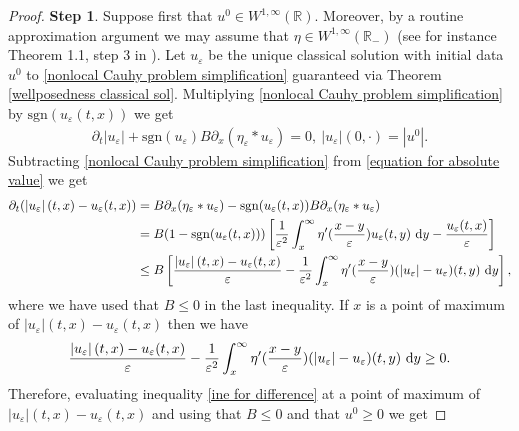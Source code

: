 \documentclass[11pt,reqno]{amsart}
\numberwithin{equation}{section}
\def\dd{{\rm d}}
\begin{document}
\begin{proof} \textbf{Step 1}. Suppose first that $u^{0}\in W^{1,\infty}(\mathbb{R})$. Moreover, by a routine approximation argument we may assume that $\eta\in W^{1,\infty}(\mathbb{R}_{-})$ (see for instance Theorem 1.1, step 3 in \cite{colombo2023nonlocal}). Let $u_{\varepsilon}$ be the unique classical solution with initial data $u^{0}$ to \eqref{nonlocal Cauhy problem simplification} guaranteed via Theorem \ref{wellposedness classical sol}. Multiplying \eqref{nonlocal Cauhy problem simplification} by $\mathrm{sgn}(u_{\varepsilon}(t,x))$ we get 
\begin{align}
\partial_{t}\left\vert u_{\varepsilon}\right\vert+\mathrm{sgn}(u_{\varepsilon})B\partial_{x}(\eta_{\varepsilon}\ast u_{\varepsilon})=0, \ \left\vert u_{\varepsilon}\right\vert (0,\cdot)=\left\vert u^{0}\right\vert. \label{equation for absolute value}  \end{align}
Subtracting \eqref{nonlocal Cauhy problem simplification} from \eqref{equation for absolute value} we get 
\begin{align}
\partial_{t}(\left\vert u_{\varepsilon}\right\vert(t,x)-u_{\varepsilon}(t,x))&=B\partial_{x}(\eta_{\varepsilon}\ast u_{\varepsilon})-\mathrm{sgn}(u_{\varepsilon}(t,x))B\partial_{x}(\eta_{\varepsilon}\ast u_{\varepsilon}) \notag\\
&=B(1-\mathrm{sgn}(u_{\varepsilon}(t,x)))\left[\frac{1}{\varepsilon^{2}}\int_{x}^{\infty}\eta'(\frac{x-y}{\varepsilon})u_{\varepsilon}(t,y)\ \dd y-\frac{u_{\varepsilon}(t,x)}{\varepsilon}\right] \notag\\
&\leq B\left[\frac{\left\vert u_{\varepsilon}\right\vert(t,x)-u_{\varepsilon}(t,x)}{\varepsilon}-\frac{1}{\varepsilon^{2}}\int_{x}^{\infty}\eta'(\frac{x-y}{\varepsilon})(\left\vert u_{\varepsilon}\right\vert-u_{\varepsilon})(t,y)\ \dd y \right], \label{ine for difference}
\end{align}
where we have used that $B\leq 0$ in the last inequality. 
If $x$ is a point of maximum of $\left\vert u_
{\varepsilon}\right\vert(t,x)-u_{\varepsilon}(t,x)$ then we have 
\begin{align*}
\frac{\left\vert u_{\varepsilon}\right\vert(t,x)-u_{\varepsilon
}(t,x)}{\varepsilon}-\frac{1}{\varepsilon^{2}}\int_{x}^{\infty}\eta'(\frac{x-y}{\varepsilon})(\left\vert u_{\varepsilon}\right\vert-u_{\varepsilon})(t,y)\ \dd y\geq 0.     
\end{align*}
Therefore, evaluating inequality \eqref{ine for difference} at a point of maximum of $\left\vert u_{\varepsilon}\right\vert (t,x)-u_{\varepsilon}(t,x)$ and using that $B\leq 0$ and that $u^{0}\geq 0$ we get 

\end{proof}
\end{document}
